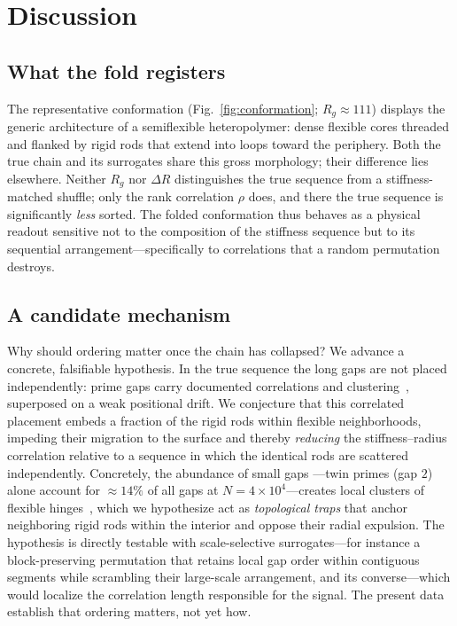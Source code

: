 \documentclass[11pt]{article}
\begin{document}
\section{Discussion}

\subsection{What the fold registers}
The representative conformation (Fig.~\ref{fig:conformation}; $R_g \approx 111$)
displays the generic architecture of a semiflexible heteropolymer: dense flexible
cores threaded and flanked by rigid rods that extend into loops toward the periphery.
Both the true chain and its surrogates share this gross morphology; their difference
lies elsewhere. Neither $R_g$ nor $\Delta R$ distinguishes the true sequence from a
stiffness-matched shuffle; only the rank correlation $\rho$ does, and there the true
sequence is significantly \emph{less} sorted. The folded conformation thus behaves as
a physical readout sensitive not to the composition of the stiffness sequence but to
its sequential arrangement---specifically to correlations that a random permutation
destroys.

\subsection{A candidate mechanism}
Why should ordering matter once the chain has collapsed? We advance a concrete,
falsifiable hypothesis. In the true sequence the long gaps are not placed
independently: prime gaps carry documented correlations and
clustering~\cite{HardyLittlewood,AresCastro}, superposed on a weak positional drift.
We conjecture that this correlated placement embeds a fraction of the rigid rods
within flexible neighborhoods, impeding their migration to the surface and thereby
\emph{reducing} the stiffness--radius correlation relative to a sequence in which the
identical rods are scattered independently. Concretely, the abundance of small gaps
---twin primes (gap $2$) alone account for ${\approx}14\%$ of all gaps at
$N = 4\times10^4$---creates local clusters of flexible hinges~\cite{HardyLittlewood},
which we hypothesize act as \emph{topological traps} that anchor neighboring rigid
rods within the interior and oppose their radial expulsion. The hypothesis is directly testable with
scale-selective surrogates---for instance a block-preserving permutation that retains
local gap order within contiguous segments while scrambling their large-scale
arrangement, and its converse---which would localize the correlation length
responsible for the signal. The present data establish that ordering matters, not yet
how.
\end{document}
